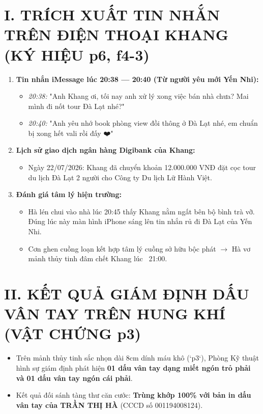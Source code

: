 \documentclass[12pt,a4paper]{article}
\begin{document}
\section*{I. TRÍCH XUẤT TIN NHẮN TRÊN ĐIỆN THOẠI KHANG (KÝ HIỆU p6, f4-3)}
\begin{enumerate}[label=\arabic*., leftmargin=1.5cm]
    \item \textbf{Tin nhắn iMessage lúc 20:38 — 20:40 (Từ người yêu mới Yến Nhi):}
    \begin{itemize}[leftmargin=0.8cm]
        \item \textit{20:38:} "Anh Khang ơi, tối nay anh xử lý xong việc bán nhà chưa? Mai mình đi nốt tour Đà Lạt nhé?"
        \item \textit{20:40:} "Anh yêu nhớ book phòng view đồi thông ở Đà Lạt nhé, em chuẩn bị xong hết vali rồi đấy ❤️"
    \end{itemize}

    \item \textbf{Lịch sử giao dịch ngân hàng Digibank của Khang:}
    \begin{itemize}[leftmargin=0.8cm]
        \item Ngày 22/07/2026: Khang đã chuyển khoản 12.000.000 VNĐ đặt cọc tour du lịch Đà Lạt 2 người cho Công ty Du lịch Lữ Hành Việt.
    \end{itemize}

    \item \textbf{Đánh giá tâm lý hiện trường:}
    \begin{itemize}[leftmargin=0.8cm]
        \item Hà lén chui vào nhà lúc 20:45 thấy Khang nằm ngất bên bộ bình trà vỡ. Đúng lúc này màn hình iPhone sáng lên tin nhắn rủ đi Đà Lạt của Yến Nhi.
        \item Cơn ghen cuồng loạn kết hợp tâm lý cuồng sở hữu bộc phát $\rightarrow$ Hà vơ mảnh thủy tinh đâm chết Khang lúc ~21:00.
    \end{itemize}
\end{enumerate}

\section*{II. KẾT QUẢ GIÁM ĐỊNH DẤU VÂN TAY TRÊN HUNG KHÍ (VẬT CHỨNG p3)}
\begin{itemize}[leftmargin=1.5cm]
    \item Trên mảnh thủy tinh sắc nhọn dài 8cm dính máu khô (`p3`), Phòng Kỹ thuật hình sự giám định phát hiện \textbf{01 dấu vân tay dạng miết ngón trỏ phải và 01 dấu vân tay ngón cái phải}.
    \item Kết quả đối sánh tàng thư căn cước: \textbf{Trùng khớp 100\% với bản in dấu vân tay của TRẦN THỊ HÀ} (CCCD số 001194008124).
\end{itemize}
\end{document}
